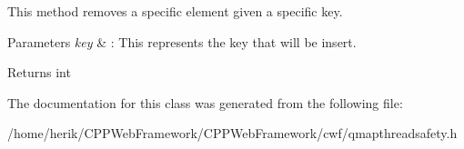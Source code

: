 This method removes a specific element given a specific key. 


\begin{DoxyParams}{Parameters}
{\em key} & \+: This represents the key that will be insert. \\
\hline
\end{DoxyParams}
\begin{DoxyReturn}{Returns}
int 
\end{DoxyReturn}


The documentation for this class was generated from the following file\+:\begin{DoxyCompactItemize}
\item 
/home/herik/\+C\+P\+P\+Web\+Framework/\+C\+P\+P\+Web\+Framework/cwf/qmapthreadsafety.\+h\end{DoxyCompactItemize}

